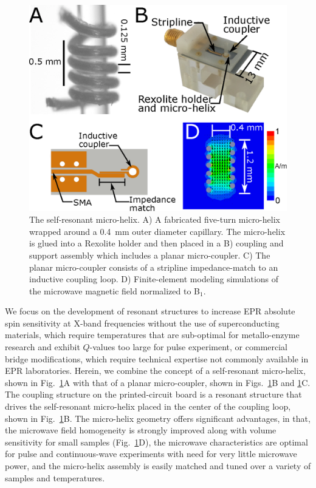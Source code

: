 \begin{figure}[htb]
\centering
 \includegraphics{Kapitel/Ch4-Images/01-MicroHelixHolder_Big2.eps}
 \caption[The self-resonant micro-helix.]{ The self-resonant micro-helix. A) A fabricated five-turn micro-helix wrapped around a 0.4~mm outer diameter capillary. The micro-helix is glued into a Rexolite holder and then placed in a B) coupling and support assembly which includes a planar micro-coupler. C) The planar micro-coupler consists of a stripline impedance-match to an inductive coupling loop. D) Finite-element modeling simulations of the microwave magnetic field normalized to B$_1$.}
 \label{fig:fabricated}
\end{figure}

We focus on the development of resonant structures to increase EPR absolute spin sensitivity at X-band frequencies without the use of superconducting materials, which require temperatures that are sub-optimal for metallo-enzyme research and exhibit $Q$-values too large for pulse experiment, or commercial bridge modifications, which require technical expertise not commonly available in EPR laboratories. Herein, we combine the concept of a self-resonant micro-helix, shown in Fig.~\ref{fig:fabricated}A with that of a planar micro-coupler, shown in Figs.~\ref{fig:fabricated}B and \ref{fig:fabricated}C. The coupling structure on the printed-circuit board is a resonant structure that drives the self-resonant micro-helix placed in the center of the coupling loop\cite{coupling2016}, shown in Fig.~\ref{fig:fabricated}B. The micro-helix geometry offers significant advantages, in that, the microwave field homogeneity is strongly improved along with volume sensitivity for small samples (Fig.~\ref{fig:fabricated}D), the microwave characteristics are optimal for pulse and continuous-wave experiments with need for very little microwave power, and the micro-helix assembly is easily matched and tuned over a variety of samples and temperatures.

